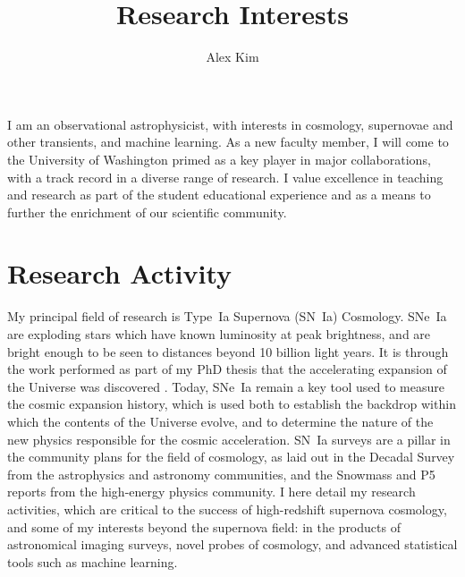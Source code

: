 \documentclass[12pt]{article}
\date{}
\newcommand{\where}{the University of Washington}
\newcommand{\where}{the University of Michigan}
\begin{document}
\title{Research Interests}
\author{Alex Kim}
\maketitle

I am an observational astrophysicist, with interests in
cosmology, supernovae and other transients, and machine learning.
As a new faculty member, I will come to \where{}
primed as a key player in major collaborations, with a
track record in a diverse range of research.  I  value excellence
in teaching and research as part of the student educational experience
and as a means to  further the enrichment of our scientific community.

\section{Research Activity}
My principal field of research is  Type~Ia Supernova (SN~Ia) Cosmology. 
SNe~Ia are exploding stars which have known luminosity at peak brightness, and are  bright enough to be
seen to distances beyond 10 billion light years.  It is through the work
performed as part of my PhD thesis that the accelerating
expansion of the Universe was discovered \cite{1997ApJ...483..565P}.  Today, SNe~Ia remain a key tool used
to measure the cosmic expansion history, which is used both to establish
the  backdrop within which the contents of the Universe evolve,
and to determine the nature of the new physics responsible
for the cosmic acceleration.
SN~Ia surveys are a pillar  in the community plans for the field of cosmology,
as laid out in
the Decadal Survey from the astrophysics and astronomy communities, and the Snowmass
\cite{2013arXiv1309.5386D,2015APh....63....2K} and P5 reports
from the high-energy physics community.  I here detail my research activities,
which are critical to the success of high-redshift supernova cosmology,
and some of my interests beyond the supernova field: in the products of astronomical imaging surveys,
novel probes of cosmology, and advanced statistical tools such as machine learning.
\end{document}
